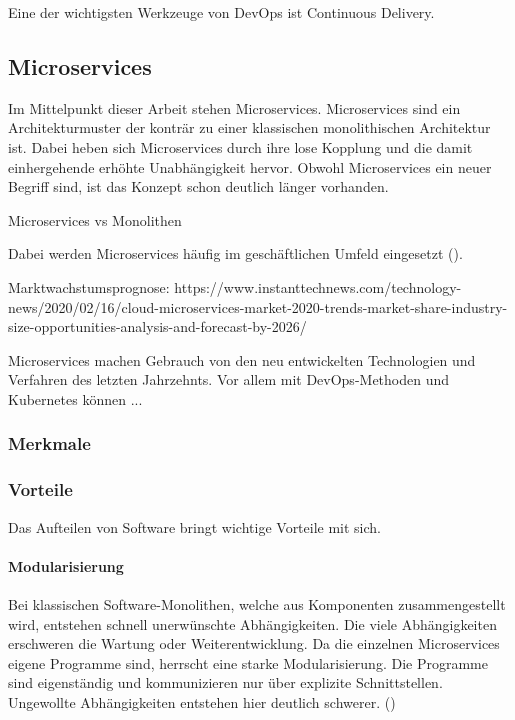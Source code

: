 Eine der wichtigsten Werkzeuge von DevOps ist Continuous Delivery.

\subsection{Microservices}

Im Mittelpunkt dieser Arbeit stehen Microservices. Microservices sind ein Architekturmuster der konträr zu einer klassischen monolithischen Architektur ist. Dabei heben sich Microservices durch ihre lose Kopplung und die damit einhergehende erhöhte Unabhängigkeit hervor. Obwohl Microservices ein neuer Begriff sind, ist das Konzept schon deutlich länger vorhanden.

Microservices vs Monolithen

Dabei werden Microservices häufig im geschäftlichen Umfeld eingesetzt (\cite[S. 15]{newmanMicroservices2015}). 

Marktwachstumsprognose: https://www.instanttechnews.com/technology-news/2020/02/16/cloud-microservices-market-2020-trends-market-share-industry-size-opportunities-analysis-and-forecast-by-2026/

Microservices machen Gebrauch von den neu entwickelten Technologien und Verfahren des letzten Jahrzehnts. Vor allem mit DevOps-Methoden und Kubernetes können ...

\subsubsection{Merkmale}



\subsubsection{Vorteile}

Das Aufteilen von Software bringt wichtige Vorteile mit sich.

\paragraph{Modularisierung}
Bei klassischen Software-Monolithen, welche aus Komponenten zusammengestellt wird, entstehen schnell unerwünschte Abhängigkeiten. Die viele Abhängigkeiten erschweren die Wartung oder Weiterentwicklung. Da die einzelnen Microservices eigene Programme sind, herrscht eine starke Modularisierung. Die Programme sind eigenständig und kommunizieren nur über explizite Schnittstellen. Ungewollte Abhängigkeiten entstehen hier deutlich schwerer. (\cite[S. 3]{wolffMicroservices2018})

